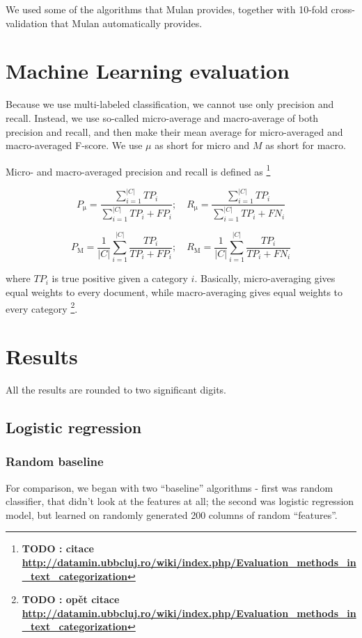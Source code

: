 \documentclass[letterpaper]{article}
\newcommand{\todofn}[1] {
 \footnote{\textbf{TODO : #1}}}
\begin{document}
We used some of the algorithms that Mulan provides, together with 10-fold cross-validation that Mulan automatically provides.

\section{Machine Learning evaluation}
Because we use multi-labeled classification, we cannot use only precision and recall. Instead, we use so-called micro-average and macro-average of both precision and recall, and then make their mean average for micro-averaged and macro-averaged F-score. We use $\mu$ as short for micro and $M$ as short for macro.

Micro- and macro-averaged precision and recall is defined as \todofn{citace \url{http://datamin.ubbcluj.ro/wiki/index.php/Evaluation_methods_in_text_categorization}} 

$$P_{\mathrm{\mu}} = \frac{\sum_{i=1}^{|C|}TP_{i}}{\sum_{i=1}^{|C|}TP_{i}+FP_{i}}; \quad R_{\mathrm{\mu}} = \frac{\sum_{i=1}^{|C|}TP_{i}}{\sum_{i=1}^{|C|}TP_{i}+FN_{i}}$$

$$P_{\mathrm{M}}=\frac{1}{|C|}\sum_{i=1}^{|C|}\frac{TP_{i}}{TP_{i}+FP_{i}};\quad R_{\mathrm{M}}=\frac{1}{|C|}\sum_{i=1}^{|C|}\frac{TP_{i}}{TP_{i}+FN_{i}}$$

where $TP_i$ is true positive given a category $i$. Basically, micro-averaging gives equal weights to every document, while macro-averaging gives equal weights to every category\todofn{opět citace \url{http://datamin.ubbcluj.ro/wiki/index.php/Evaluation_methods_in_text_categorization}}.

\section{Results}
All the results are rounded to two significant digits.
\subsection{Logistic regression}
\subsubsection{Random baseline}

For comparison, we began with two ``baseline'' algorithms - first was random classifier, that didn't look at the features at all; the second was logistic regression model, but learned on randomly generated 200 columns of random ``features''.
\end{document}
